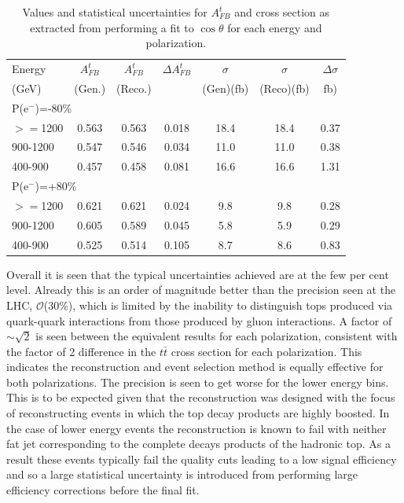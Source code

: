 \begin{table}
  \centering
  \begin{tabular}{l|c|c|c|c|c|c}
    \toprule
     Energy & $A_{FB}^t$ & $A_{FB}^t$  & $\Delta A^t_{FB}$ &  $\sigma$  &  $\sigma$  &  $\Delta\sigma$ \\
     (GeV) & (Gen.) & (Reco.) &  &  (Gen)(fb) &  (Reco)(fb) &  fb)\\
     \midrule
     \midrule
     \multicolumn{7}{l}{P(e$^-$)=-80\%} \\
     \midrule
     \midrule
    $>=$1200  & 0.563 & 0.563 & 0.018 & 18.4 & 18.4 & 0.37 \\
    \midrule
    900-1200  & 0.547 & 0.546 & 0.034 & 11.0 & 11.0 & 0.38 \\
    \midrule
    400-900   & 0.457 & 0.458 & 0.081 & 16.6 & 16.6 & 1.31 \\
    \midrule
    \midrule
   \multicolumn{7}{l}{ P(e$^-$)=+80\%}\\
    \midrule
    \midrule
    $>=$1200  & 0.621 & 0.621 & 0.024 & 9.8 & 9.8 & 0.28 \\
    \midrule
    900-1200  & 0.605 & 0.589 & 0.045 & 5.8 & 5.9 & 0.29 \\
    \midrule
    400-900   & 0.525 & 0.514 & 0.105 & 8.7 & 8.6 & 0.83 \\
    \bottomrule
  \end{tabular}
  \caption{Values and statistical uncertainties for $A_{FB}^t$ and cross section as extracted from performing a fit to $\cos\theta$ for each energy and polarization.}
  \label{tab:finalfitresults}
\end{table}

Overall it is seen that the typical uncertainties achieved are at the few per cent level. Already this is an order of magnitude better than the precision seen at the \ac{LHC}, $\mathcal{O}$(30\%)\cite{Bai:2011uk}, which is limited by the inability to distinguish tops produced via quark-quark interactions from those produced by gluon interactions. A factor of $\sim$$\sqrt{2}$ is seen between the equivalent results for each polarization, consistent with the factor of 2 difference in the $t\bar{t}$ cross section for each polarization. This indicates the reconstruction and event selection method is equally effective for both polarizations. The precision is seen to get worse for the lower energy bins. This is to be expected given that the reconstruction was designed with the focus of reconstructing events in which the top decay products are highly boosted. In the case of lower energy events the reconstruction is known to fail with neither fat jet corresponding to the complete decays products of the hadronic top. As a result these events typically fail the quality cuts leading to a low signal efficiency and so a large statistical uncertainty is introduced from  performing large efficiency corrections before the final fit.


